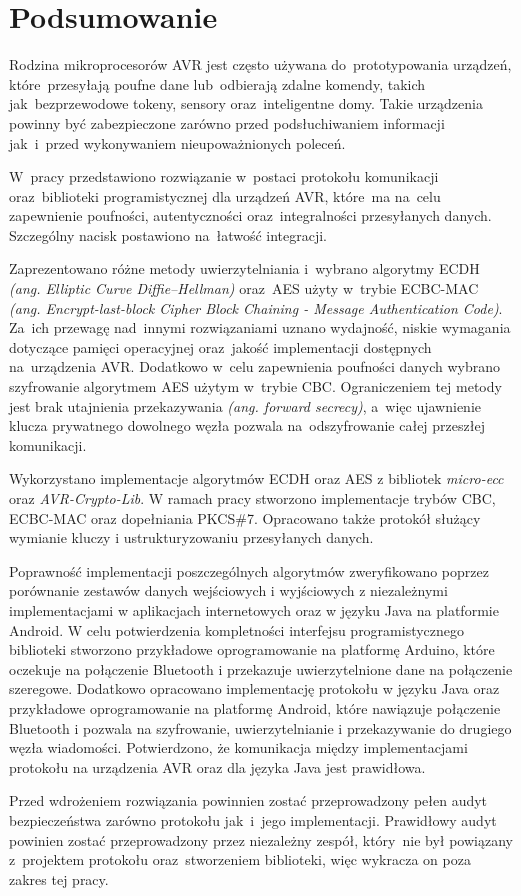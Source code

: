 \chapter*{Podsumowanie}
\label{cha:podsumowanie}

Rodzina mikroprocesorów AVR jest często używana do~prototypowania urządzeń, które~przesyłają poufne dane lub~odbierają zdalne komendy, takich jak~bezprzewodowe tokeny, sensory oraz~inteligentne domy. Takie urządzenia powinny być zabezpieczone zarówno przed podsłuchiwaniem informacji jak~i~przed wykonywaniem nieupoważnionych poleceń.

W~pracy przedstawiono rozwiązanie w~postaci protokołu komunikacji oraz~biblioteki programistycznej dla urządzeń AVR, które~ma na~celu zapewnienie poufności, autentyczności oraz~integralności przesyłanych danych. Szczególny nacisk postawiono na~łatwość integracji.

Zaprezentowano różne metody uwierzytelniania i~wybrano algorytmy ECDH \emph{(ang. Elliptic Curve Diffie--Hellman)} oraz~AES użyty w~trybie ECBC-MAC \emph{(ang. Encrypt-last-block Cipher Block Chaining - Message Authentication Code)}. Za~ich przewagę nad~innymi rozwiązaniami uznano wydajność, niskie wymagania dotyczące pamięci operacyjnej oraz~jakość implementacji dostępnych na~urządzenia AVR. Dodatkowo w~celu zapewnienia poufności danych wybrano szyfrowanie algorytmem AES użytym w~trybie CBC. Ograniczeniem tej metody jest brak utajnienia przekazywania \emph{(ang. forward secrecy)}, a~więc ujawnienie klucza prywatnego dowolnego węzła pozwala na~odszyfrowanie całej przeszłej komunikacji.

Wykorzystano implementacje algorytmów ECDH oraz AES z bibliotek \emph{micro-ecc} oraz \emph{AVR-Crypto-Lib}. W ramach pracy stworzono implementacje trybów CBC, ECBC-MAC oraz dopełniania PKCS\#7. Opracowano także protokół służący wymianie kluczy i ustrukturyzowaniu przesyłanych danych.

Poprawność implementacji poszczególnych algorytmów zweryfikowano poprzez porównanie zestawów danych wejściowych i wyjściowych z niezależnymi implementacjami w aplikacjach internetowych oraz w języku Java na platformie Android. W celu potwierdzenia kompletności interfejsu programistycznego biblioteki stworzono przykładowe oprogramowanie na platformę Arduino, które oczekuje na połączenie Bluetooth i przekazuje uwierzytelnione dane na połączenie szeregowe. Dodatkowo opracowano implementację protokołu w języku Java oraz przykładowe oprogramowanie na platformę Android, które nawiązuje połączenie Bluetooth i pozwala na szyfrowanie, uwierzytelnianie i przekazywanie do drugiego węzła wiadomości. Potwierdzono, że komunikacja między implementacjami protokołu na urządzenia AVR oraz dla języka Java jest prawidłowa.

Przed wdrożeniem rozwiązania powinnien zostać przeprowadzony pełen audyt bezpieczeństwa zarówno protokołu jak~i~jego implementacji. Prawidłowy audyt powinien zostać przeprowadzony przez niezależny zespół, który~nie był powiązany z~projektem protokołu oraz~stworzeniem biblioteki, więc wykracza on poza zakres tej pracy.
